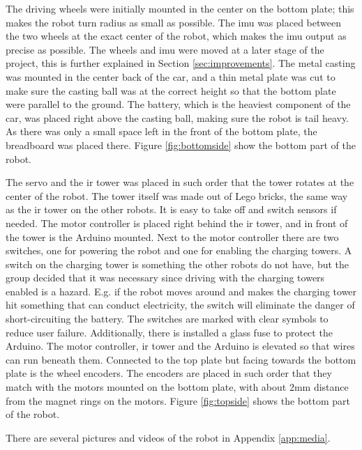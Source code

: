 The driving wheels were initially mounted in the center on the bottom plate; this makes the robot turn radius as small as possible. The \acrshort{imu} was placed between the two wheels at the exact center of the robot, which makes the \acrshort{imu} output as precise as possible. The wheels and \acrshort{imu} were moved at a later stage of the project, this is further explained in Section \ref{sec:improvements}. The metal casting was mounted in the center back of the car, and a thin metal plate was cut to make sure the casting ball was at the correct height so that the bottom plate were parallel to the ground. The battery, which is the heaviest component of the car, was placed right above the casting ball, making sure the robot is tail heavy. As there was only a small space left in the front of the bottom plate, the breadboard was placed there. Figure \ref{fig:bottomside} show the bottom part of the robot.

The servo and the \acrshort{ir} tower was placed in such order that the tower rotates at the center of the robot. The tower itself was made out of Lego bricks, the same way as the \acrshort{ir} tower on the other robots. It is easy to take off and switch sensors if needed. The motor controller is placed right behind the \acrshort{ir} tower, and in front of the tower is the Arduino mounted. Next to the motor controller there are two switches, one for powering the robot and one for enabling the charging towers. A switch on the charging tower is something the other robots do not have, but the group decided that it was necessary since driving with the charging towers enabled is a hazard. E.g. if the robot moves around and makes the charging tower hit something that can conduct electricity, the switch will eliminate the danger of short-circuiting the battery. The switches are marked with clear symbols to reduce user failure. Additionally, there is installed a glass fuse to protect the Arduino. The motor controller, \acrshort{ir} tower and the Arduino is elevated so that wires can run beneath them. Connected to the top plate but facing towards the bottom plate is the wheel encoders. The encoders are placed in such order that they match with the motors mounted on the bottom plate, with about 2mm distance from the magnet rings on the motors. Figure \ref{fig:topside} shows the bottom part of the robot.

There are several pictures and videos of the robot in Appendix \ref{app:media}.


